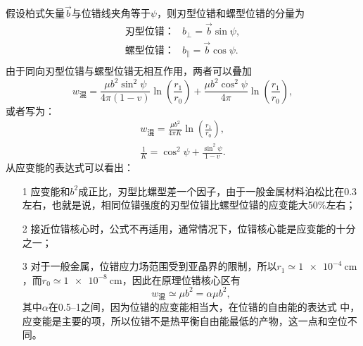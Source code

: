                 假设柏式矢量$\vec{b}$与位错线夹角等于$\psi$，则刃型位错和螺型位错的分量为
                \begin{align}
                    \text{刃型位错：}&b_\perp=\vec{b}\sin\psi,\\
                    \text{螺型位错：}&b_\parallel=\vec{b}\cos\psi.\\                
                \end{align}
                由于同向刃型位错与螺型位错无相互作用，两者可以叠加
                \begin{equation}
                    w_{\text{混}}=\frac{\mu b^{2} \sin ^{2} \psi}{4 \pi(1-v)} \ln \left(\frac{r_{1}}{r_{0}}\right)+\frac{\mu b^{2} \cos ^{2} \psi}{4 \pi} \ln \left(\frac{r_{1}}{r_{0}}\right),
                \end{equation}
                或者写为：
                \begin{align}
                    w_{\text{混}}=\frac{\mu b^{2}}{4 \pi K} \ln \left(\frac{r_{1}}{r_{0}}\right),\\
                    \frac{1}{K}=\cos^2\psi+\frac{\sin^2\psi}{1-v}.
                \end{align}
                从应变能的表达式可以看出：
                \begin{itemize}
                    \item[1] 应变能和$b^2$成正比，刃型比螺型差一个因子，由于一般金属材料泊松比在0.3左右，也就是说，相同位错强度的刃型位错比螺型位错的应变能大50\%左右；
                    \item[2] 接近位错核心时，公式不再适用，通常情况下，位错核心能是应变能的十分之一；
                    \item[3] 对于一般金属，位错应力场范围受到亚晶界的限制，所以$r_1\simeq\SI{1e-4}{\cm}$，而$r_0\simeq\SI{1e-8}{\cm}$，因此在原理位错核心区有
                    \begin{equation}
                        w_{\text{混}}\simeq\mu b^2=\alpha\mu b^2,
                    \end{equation} 
                    其中$\alpha$在\numrange{0.5}{1}之间，因为位错的应变能相当大，在位错的自由能的表达式
                    中，应变能是主要的项，所以位错不是热平衡自由能最低的产物，这一点和空位不
                    同。
                \end{itemize}
